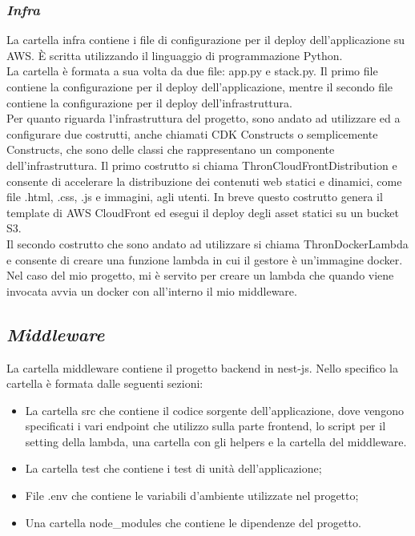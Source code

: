 \subsubsection*{\emph{Infra}}
La cartella infra contiene i file di configurazione per il deploy dell'applicazione su AWS. È scritta utilizzando il linguaggio di programmazione Python.\\
La cartella è formata a sua volta da due file: app.py e stack.py. Il primo file contiene la configurazione per il deploy dell'applicazione, mentre il secondo file contiene la configurazione per il deploy dell'infrastruttura.\\
Per quanto riguarda l'infrastruttura del progetto, sono andato ad utilizzare ed a configurare due costrutti, anche chiamati CDK Constructs o semplicemente Constructs, che sono delle classi che rappresentano un componente dell'infrastruttura.
Il primo costrutto si chiama ThronCloudFrontDistribution e consente di accelerare la distribuzione dei contenuti web statici e dinamici, come file .html, .css, .js e immagini, agli utenti.
In breve questo costrutto genera il template di AWS CloudFront ed esegui il deploy degli asset statici su un bucket S3.\\
Il secondo costrutto che sono andato ad utilizzare si chiama ThronDockerLambda e consente di creare una funzione lambda in cui il gestore è un'immagine docker.
Nel caso del mio progetto, mi è servito per creare un lambda che quando viene invocata avvia un docker con all'interno il mio middleware.\\

\subsection*{\emph{Middleware}}
La cartella middleware contiene il progetto backend in nest-js. Nello specifico la cartella è formata dalle seguenti sezioni:
\begin{itemize}
  \item La cartella src che contiene il codice sorgente dell'applicazione, dove vengono specificati i vari endpoint che utilizzo sulla parte frontend, lo script per il setting
  della lambda, una cartella con gli helpers e la cartella del middleware.
  \item La cartella test che contiene i test di unità dell'applicazione;
  \item File .env che contiene le variabili d'ambiente utilizzate nel progetto;
  \item Una cartella node\_modules che contiene le dipendenze del progetto.
\end{itemize}
